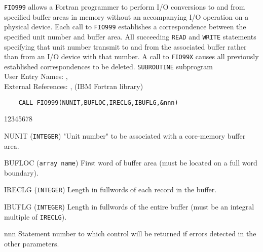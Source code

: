                               
     
                
  
\begin{center}
\end{center}
{\tt FIO999} allows a Fortran programmer to perform I/O
conversions to and from specified buffer areas in memory without an
accompanying I/O
operation on a physical device. Each call to {\tt FIO999} establishes a
correspondence between the specified unit number and buffer area. All
succeeding {\tt READ} and {\tt WRITE} statements specifying that unit
number transmit to and from the associated buffer rather than from an I/O
device with that number. A call to {\tt FIO99X} causes all previously
established correspondences to be deleted.
\Structure
{\tt SUBROUTINE} subprogram \\
User Entry Names: , \\
External References: , 
(IBM Fortran library)
\Usage
\begin{verbatim}
    CALL FIO999(NUNIT,BUFLOC,IRECLG,IBUFLG,&nnn)
\end{verbatim}
\begin{DLtt}{12345678}
\item [NUNIT] ({\tt INTEGER}) "Unit number" to be associated with a
core-memory buffer area.
\item [BUFLOC] ({\tt array name}) First word of buffer area (must be
located on a full word boundary).
\item [IRECLG]({\tt INTEGER}) Length in fullwords of each record in the
buffer.
\item [IBUFLG]({\tt INTEGER}) Length in fullwords of the entire buffer
(must be an integral multiple of {\tt IRECLG}).
\item [nnn] Statement number to which control will be returned
if errors detected in the other parameters.
\end{DLtt}
